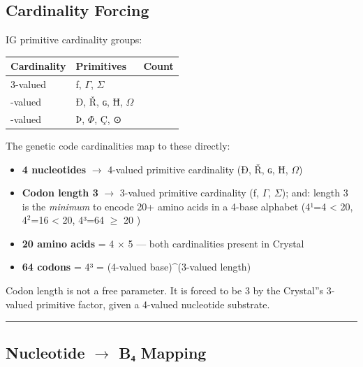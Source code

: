 \documentclass[12pt,a4paper]{article}
\begin{document}
\subsection{Cardinality Forcing}

IG primitive cardinality groups:

\begin{table}[htbp]
\centering
\small
{}
\begin{tabularx}{\textwidth}{>{\centering\arraybackslash}X >{\centering\arraybackslash}X >{\centering\arraybackslash}X}
\toprule
\rowcolor{gray!25}\textbf{Cardinality} & \textbf{Primitives} & \textbf{Count} \\
\midrule
\rowcolors{1}{white}{gray!10}
3-valued & ƒ, $\Gamma$, $\Sigma$ & 3 \\
4-valued & Ð, Ř, ɢ, Ħ, $\Omega$ & 5 \\
5-valued & Þ, $\Phi$, Ç, ⊙ & 4 \\
\bottomrule
\end{tabularx}
\end{table}

The genetic code cardinalities map to these directly:

\begin{itemize}
    \item \textbf{4 nucleotides} $\rightarrow$ 4-valued primitive cardinality (Ð, Ř, ɢ, Ħ, $\Omega$)
    \item \textbf{Codon length 3} $\rightarrow$ 3-valued primitive cardinality (ƒ, $\Gamma$, $\Sigma$); and: length 3 is the \emph{minimum} to encode 20+ amino acids in a 4-base alphabet (4¹=4 \textless{} 20, 4$^{2}$=16 \textless{} 20, 4³=64 $\geq$ 20 )
    \item \textbf{20 amino acids} = 4 $\times$ 5 --- both cardinalities present in Crystal
    \item \textbf{64 codons} = 4³ = (4-valued base)\^{}(3-valued length)
\end{itemize}

Codon length is not a free parameter. It is forced to be 3 by the Crystal''s 3-valued
primitive factor, given a 4-valued nucleotide substrate.

\begin{center}
\rule{0.5\textwidth}{0.4pt}
\end{center}

\subsection{Nucleotide $\rightarrow$ B₄ Mapping}
\end{document}
